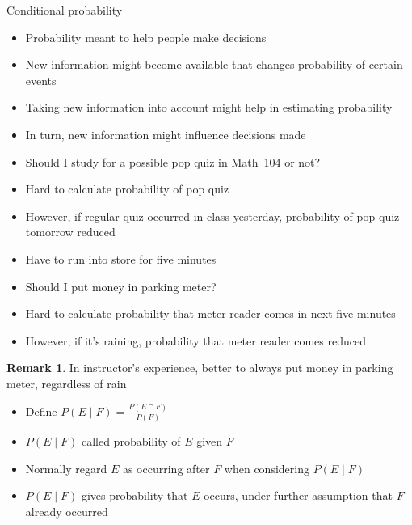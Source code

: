 \documentclass{beamer}
\theoremstyle{definition}
\newtheorem{remark}{Remark}
\begin{document}
\begin{frame}{Conditional probability}
\begin{itemize}
\item Probability meant to help people make decisions
\item New information might become available
that changes probability of certain events
\item Taking new information into account
might help in estimating probability
\item In turn, new information might influence decisions made
\end{itemize}
\begin{example}
\begin{itemize}
\item Should I study for a possible pop quiz in Math~104 or not?
\item Hard to calculate probability of pop quiz
\item However, if regular quiz occurred in class yesterday,
probability of pop quiz tomorrow reduced
\end{itemize}
\end{example}
\end{frame}

\begin{frame}
\begin{example}
\begin{itemize}
\item Have to run into store for five minutes
\item Should I put money in parking meter?
\item Hard to calculate probability that meter reader
comes in next five minutes
\item However, if it's raining, probability that meter reader
comes reduced
\end{itemize}
\end{example}
\begin{remark}
In instructor's experience, better to always put money
in parking meter, regardless of rain
\end{remark}
\end{frame}

\begin{frame}
\begin{definition}
\begin{itemize}
\item Define $P\left(E\mid F\right)
=\frac{P\left(E\cap F\right)}{P\left(F\right)}$
\item $P\left(E\mid F\right)$ called
\alert{probability of $E$ given $F$}
\end{itemize}
\end{definition}
\begin{itemize}
\item Normally regard $E$ as occurring
\alert{after} $F$ when considering $P\left(E\mid F\right)$
\item $P\left(E\mid F\right)$ gives probability that $E$ occurs,
under further assumption that $F$ already occurred
\end{itemize}
\end{frame}
\end{document}
